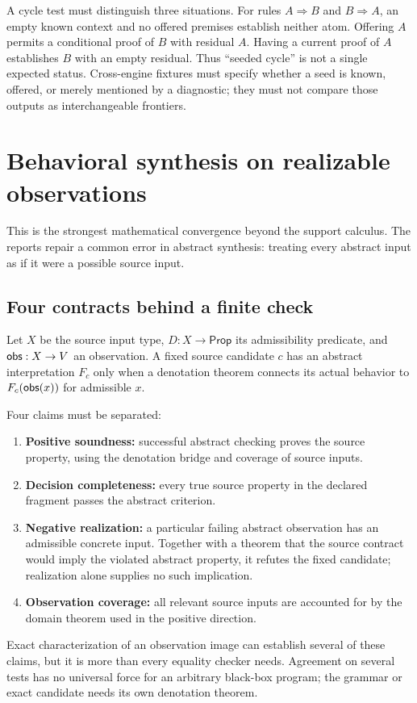 \documentclass[11pt,letterpaper]{article}
\theoremstyle{definition}\newtheorem{definition}[proposition]{Definition}
\theoremstyle{remark}\newtheorem{remark}[proposition]{Remark}
\begin{document}
A cycle test must distinguish three situations. For rules $A\Rightarrow B$
and $B\Rightarrow A$, an empty known context and no offered premises establish
neither atom. Offering $A$ permits a conditional proof of $B$ with residual
$A$. Having a current proof of $A$ establishes $B$ with an empty residual.
Thus ``seeded cycle'' is not a single expected status. Cross-engine fixtures
must specify whether a seed is known, offered, or merely mentioned by a
diagnostic; they must not compare those outputs as interchangeable frontiers.

\section{Behavioral synthesis on realizable observations}
\label{sec:frames}

This is the strongest mathematical convergence beyond the support calculus.
The reports repair a common error in abstract synthesis: treating every
abstract input as if it were a possible source input.

\subsection{Four contracts behind a finite check}

Let $X$ be the source input type, $D:X\to\mathsf{Prop}$ its admissibility
predicate, and $\mathsf{obs}:X\to V$ an observation. A fixed source candidate $c$
has an abstract interpretation $F_c$ only when a denotation theorem connects
its actual behavior to $F_c(\mathsf{obs}(x))$ for admissible $x$.

Four claims must be separated:
\begin{enumerate}
\item \textbf{Positive soundness:} successful abstract checking proves the
source property, using the denotation bridge and coverage of source inputs.
\item \textbf{Decision completeness:} every true source property in the
declared fragment passes the abstract criterion.
\item \textbf{Negative realization:} a particular failing abstract observation
has an admissible concrete input. Together with a theorem that the source
contract would imply the violated abstract property, it refutes the fixed
candidate; realization alone supplies no such implication.
\item \textbf{Observation coverage:} all relevant source inputs are accounted
for by the domain theorem used in the positive direction.
\end{enumerate}
Exact characterization of an observation image can establish several of
these claims, but it is more than every equality checker needs. Agreement on
several tests has no universal force for an arbitrary black-box program;
the grammar or exact candidate needs its own denotation theorem.
\end{document}
